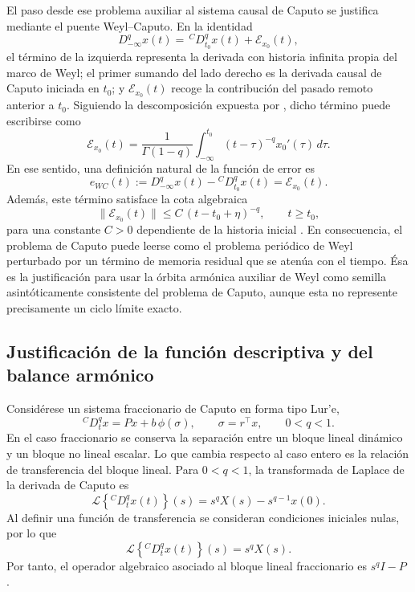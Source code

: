 \documentclass[journal]{IEEEtran}
\begin{document}
El paso desde ese problema auxiliar al sistema causal de Caputo se justifica mediante el puente Weyl--Caputo. En la identidad
\[
D_{-\infty}^{q}x(t)=\,{}^{C}D_{t_0}^{q}x(t)+\mathcal E_{x_0}(t),
\]
el término de la izquierda representa la derivada con historia infinita propia del marco de Weyl; el primer sumando del lado derecho es la derivada causal de Caputo iniciada en \(t_0\); y \(\mathcal E_{x_0}(t)\) recoge la contribución del pasado remoto anterior a \(t_0\). Siguiendo la descomposición expuesta por \cite{Haacker2026}, dicho término puede escribirse como
\[
\mathcal E_{x_0}(t)
=
\frac{1}{\Gamma(1-q)}
\int_{-\infty}^{t_0}(t-\tau)^{-q}x_0'(\tau)\,d\tau.
\]
En ese sentido, una definición natural de la función de error es
\[
e_{WC}(t):=D_{-\infty}^{q}x(t)-{}^{C}D_{t_0}^{q}x(t)=\mathcal E_{x_0}(t).
\]
Además, este término satisface la cota algebraica
\[
\|\mathcal E_{x_0}(t)\|\le C\,(t-t_0+\eta)^{-q},
\qquad t\ge t_0,
\]
para una constante \(C>0\) dependiente de la historia inicial \cite{Haacker2026}. En consecuencia, el problema de Caputo puede leerse como el problema periódico de Weyl perturbado por un término de memoria residual que se atenúa con el tiempo. Ésa es la justificación para usar la órbita armónica auxiliar de Weyl como semilla asintóticamente consistente del problema de Caputo, aunque esta no represente precisamente un ciclo límite exacto.



\subsection{Justificación de la función descriptiva y del balance armónico}

Considérese un sistema fraccionario de Caputo en forma tipo Lur'e,
\begin{equation}
\label{eq:lure_frac_general}
{}^{C}D_t^q x
=
Px+b\,\phi(\sigma),
\qquad
\sigma=r^\top x,
\qquad
0<q<1.
\end{equation}
En el caso fraccionario se conserva la separación entre un bloque lineal
dinámico y un bloque no lineal escalar. Lo que cambia respecto al caso
entero es la relación de transferencia del bloque lineal. Para \(0<q<1\),
la transformada de Laplace de la derivada de Caputo es
\[
\mathcal L\left\{{}^{C}D_t^q x(t)\right\}(s)
=
s^qX(s)-s^{q-1}x(0).
\]
Al definir una función de transferencia se consideran condiciones iniciales
nulas, por lo que
\[
\mathcal L\left\{{}^{C}D_t^q x(t)\right\}(s)
=
s^qX(s).
\]
Por tanto, el operador algebraico asociado al bloque lineal fraccionario es
\(s^q I-P\) \cite{Podlubny1999,Monje2010}.
\end{document}
